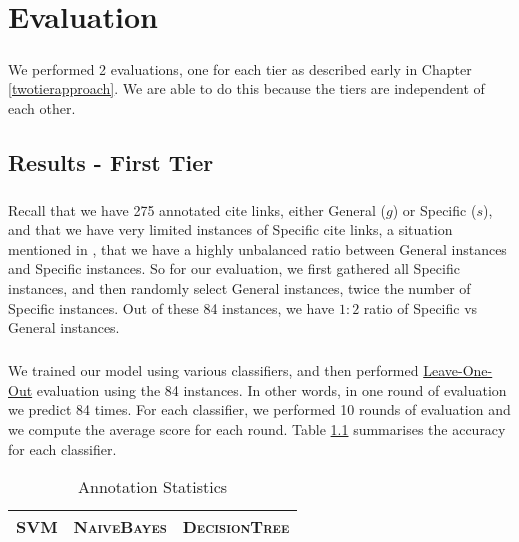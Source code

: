 \chapter{Evaluation}
\label{evaluation}
\paragraph{}
We performed 2 evaluations, one for each tier as described early in Chapter \ref{twotierapproach}. We are able to do this because the tiers are independent of each other.

\section{Results - First Tier}
\paragraph{}
Recall that we have 275 annotated cite links, either General ($g$) or Specific ($s$), and that we have very limited instances of Specific cite links, a situation mentioned in \cite{li2010negative}, that we have a highly unbalanced ratio between General instances and Specific instances. So for our evaluation, we first gathered all Specific instances, and then randomly select General instances, twice the number of Specific instances. Out of these 84 instances, we have $1:2$ ratio of Specific vs General instances.

\paragraph{}
We trained our model using various classifiers, and then performed \url{Leave-One-Out} evaluation using the 84 instances. In other words, in one round of evaluation we predict 84 times. For each classifier, we performed 10 rounds of evaluation and we compute the average score for each round. Table \ref{tab:firsttieresults} summarises the accuracy for each classifier.

\begin{table}[h]
	\center
	\begin{tabular}{| l | l | l |}
		\hline
		\textsc{SVM} & \textsc{NaiveBayes} & \textsc{DecisionTree} \\
		\hline
		
	\end{tabular}
	\caption{Annotation Statistics}
	\label{tab:firsttieresults}
\end{table}
